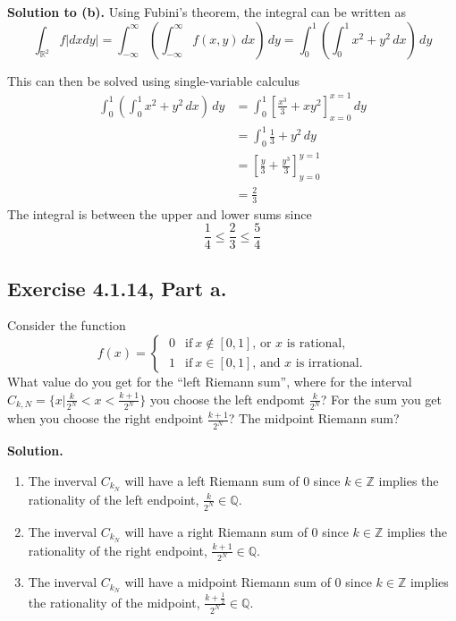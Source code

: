 \documentclass{article}
\newcommand{\reals}{\mathbb{R}}
\newcommand{\rationals}{\mathbb{Q}}
\newcommand{\integers}{\mathbb{Z}}
\begin{document}
\textbf{Solution to (b).}
Using Fubini's theorem, the integral can be written as 
\[
    \int_{\reals^2} f |dxdy|
    =\int_{-\infty}^\infty (\int_{-\infty}^\infty f(x, y) \,dx) \,dy
    = \int_0^1 (\int_0^1 x^2+y^2 \,dx) \,dy
\]

This can then be solved using single-variable calculus
\begin{align*}
    \int_0^1 (\int_0^1 x^2+y^2 \,dx) \,dy
    &= \int_0^1 \left[\frac{x^3}{3} + xy^2\right]_{x=0}^{x=1} \,dy \\
    &= \int_0^1 \frac{1}{3} + y^2 \,dy \\
    &= \left[ \frac{y}{3} + \frac{y^3}{3} \right]_{y=0}^{y=1} \\
    &= \frac{2}{3}
\end{align*}
The integral is between the upper and lower sums since
\[
    \frac{1}{4} \leq \frac{2}{3} \leq \frac{5}{4}
\]
\newpage

\subsection*{Exercise 4.1.14, Part a.}

Consider the function
$$f(x) = \begin{cases}
      \; 0 & \text{if}\ x\notin [0,1] \text{, or }x \text{ is rational}, \\
      \; 1 & \text{if}\ x\in [0,1] \text{, and }x \text{ is irrational}.
    \end{cases}$$
What value do you get for the ``left Riemann sum'', where for the interval
$ C_{k,N} = \Big\{ x \Big| \frac{k}{2^N} < x <\frac{k+1}{2^N}\Big\}$
you choose the left endpomt $\frac{k}{2^N}$?  For the sum you get when you choose the right endpoint $\frac{k+1}{2^N}$? The midpoint Riemann sum?
\medskip 

\textbf{Solution.}
\begin{enumerate}
    \item 
    The inverval $C_{k_N}$ will have a left Riemann sum of 0 
    since $k \in \integers$ implies the rationality of the left endpoint, 
    $\frac{k}{2^N} \in \rationals$. 
    \item 
    The inverval $C_{k_N}$ will have a right Riemann sum of 0 
    since $k \in \integers$ implies the rationality of the right endpoint, 
    $\frac{k+1}{2^N} \in \rationals$. 
    \item 
    The inverval $C_{k_N}$ will have a midpoint Riemann sum of 0
    since $k \in \integers$ implies the rationality of the midpoint, 
    $\frac{k+\frac{1}{2}}{2^N} \in \rationals$.
\end{enumerate}
\end{document}
